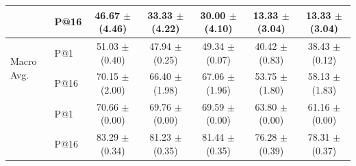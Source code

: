 \documentclass{article}
\begin{document}
{\begin{table}[H]
{\begin{tabular}{llccccc}
                                        & P@16 & 46.67 $\pm$ (4.46) & 33.33 $\pm$ (4.22) & 30.00 $\pm$ (4.10)  & 13.33 $\pm$ (3.04) & 13.33 $\pm$ (3.04) \\ 
        \midrule
         \midrule
         \multirow{2}{*}{Macro Avg.}     & P@1  & 51.03 $\pm$ (0.40) & 47.94 $\pm$ (0.25) & 49.34 $\pm$ (0.07)  & 40.42 $\pm$ (0.83) & 38.43 $\pm$ (0.12)  \\
                                         & P@16 & 70.15 $\pm$ (2.00) & 66.40 $\pm$ (1.98) & 67.06 $\pm$ (1.96)
  &  53.75 $\pm$ (1.80) & 58.13 $\pm$ (1.83)  \\ \addlinespace[3pt]
         \multirow{2}{*}{Micro Avg.}     & P@1  & 70.66 $\pm$ (0.00) & 69.76 $\pm$ (0.00) & 69.59 $\pm$ (0.00)
  &  63.80 $\pm$ (0.00) & 61.16 $\pm$ (0.00)  \\
                                         & P@16 & 83.29 $\pm$ (0.34) & 81.23 $\pm$ (0.35) & 81.44 $\pm$ (0.35)
  &  76.28 $\pm$ (0.39) & 78.31 $\pm$ (0.37)  \\
        \bottomrule
    \end{tabular}
    }
    \label{app:main_results_full}
\end{table}

}
\end{document}
